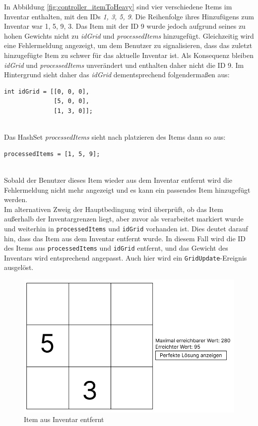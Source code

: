 In Abbildung \ref{fig:controller_itemToHeavy} sind vier verschiedene Items im Inventar enthalten, mit den IDs
\textit{1, 3, 5, 9}. Die Reihenfolge ihres Hinzufügens zum Inventar war 1, 5, 9, 3. Das Item mit der ID 9 wurde jedoch
aufgrund seines zu hohen Gewichts nicht zu \textit{idGrid} und \textit{processedItems} hinzugefügt. Gleichzeitig wird
eine Fehlermeldung angezeigt, um dem Benutzer zu signalisieren, dass das zuletzt hinzugefügte Item zu schwer für das
aktuelle Inventar ist. Als Konsequenz bleiben \textit{idGrid} und \textit{processedItems} unverändert und enthalten
daher nicht die ID 9. Im Hintergrund sieht daher das \textit{idGrid} dementsprechend folgendermaßen aus:
\begin{lstlisting}[style=csharp, caption={Item zu schwer fuer das Inventar}, label=code:controller_savedIDs]
int idGrid = [[0, 0, 0],
              [5, 0, 0],
              [1, 3, 0]];
\end{lstlisting}\\
Das HashSet \textit{processedItems} sieht nach platzieren des Items dann so aus:
\begin{lstlisting}[style=csharp, caption={ID verspeichert}, label=code:controller_savedID]
processedItems = [1, 5, 9];
\end{lstlisting}\\
Sobald der Benutzer dieses Item wieder aus dem Inventar entfernt wird die Fehlermeldung nicht mehr angezeigt und es kann
ein passendes Item hinzugefügt werden.\\

Im alternativen Zweig der Hauptbedingung wird überprüft, ob das Item außerhalb der Inventargrenzen liegt, aber zuvor
als verarbeitet markiert wurde und weiterhin in \texttt{processedItems} und \texttt{idGrid} vorhanden ist. Dies deutet
darauf hin, dass das Item aus dem Inventar entfernt wurde. In diesem Fall wird die ID des Items aus \texttt{processedItems}
und \texttt{idGrid} entfernt, und das Gewicht des Inventars wird entsprechend angepasst. Auch hier wird ein
\texttt{GridUpdate}-Ereignis ausgelöst.\\

\begin{figure}[h]
    \centering
    \includegraphics[scale=0.6]{images/itemEntfernt}
    \caption{Item aus Inventar entfernt}
    \label{fig:controller_itemEntfernt}
\end{figure}

